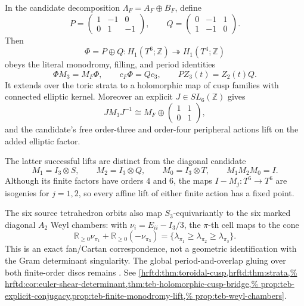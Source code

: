 \begin{enumerate}[leftmargin=1.8em]
In the candidate decomposition
\(\Lambda_F=A_F\oplus B_F\), define
\[
 P=\begin{pmatrix}1&-1&0\\0&1&-1\end{pmatrix},
 \qquad
 Q=\begin{pmatrix}0&-1&1\\1&-1&0\end{pmatrix}.
\]
Then
\[
 \Phi=P\oplus Q:H_1(T^6;\mathbb Z)
 \twoheadrightarrow H_1(T^4;\mathbb Z)
\]
obeys the literal monodromy, filling, and period identities
\[
 \Phi M_3=M_F\Phi,\qquad c_F\Phi=Qc_3,\qquad
 PZ_3(t)=Z_2(t)Q.
\]
It extends over the toric strata to a holomorphic map of cusp families with
connected elliptic kernel.  Moreover an explicit \(J\in SL_6(\mathbb Z)\)
gives
\[
 JM_3J^{-1}\cong
 M_F\oplus\begin{pmatrix}1&1\\0&1\end{pmatrix},
\]
 and the candidate's free order-three and order-four peripheral actions lift
 on the added elliptic factor.

The latter successful lifts are distinct from the diagonal candidate
\[
 M_1=I_3\otimes S,\qquad M_2=I_3\otimes Q,\qquad M_0=I_3\otimes T,
 \qquad M_1M_2M_0=I.
\]
Although its finite factors have orders \(4\) and \(6\), the maps
\(I-M_j:T^6\to T^6\) are isogenies for \(j=1,2\), so every affine lift of
either finite action has a fixed point.

The six source tetrahedron orbits also map \(S_3\)-equivariantly to the six
marked diagonal \(A_2\) Weyl chambers: with
\(\nu_i=E_{ii}-I_3/3\), the \(\pi\)-th cell maps to the cone
\[
 \mathbb R_{\geq0}\nu_{\pi_1}
 +\mathbb R_{\geq0}(-\nu_{\pi_3})
 =\{\lambda_{\pi_1}\geq\lambda_{\pi_2}
                    \geq\lambda_{\pi_3}\}.
\]
This is an exact fan/Cartan correspondence, not a geometric identification
with the Gram determinant singularity.  The global period-and-overlap gluing
over both finite-order discs remains \Open.  See
\cref{hrftd:thm:toroidal-cusp,hrftd:thm:strata,%
hrftd:cor:euler-shear-determinant,thm:teb-holomorphic-cusp-bridge,%
 prop:teb-explicit-conjugacy,prop:teb-finite-monodromy-lift,%
 prop:teb-weyl-chambers}.


\end{enumerate}
